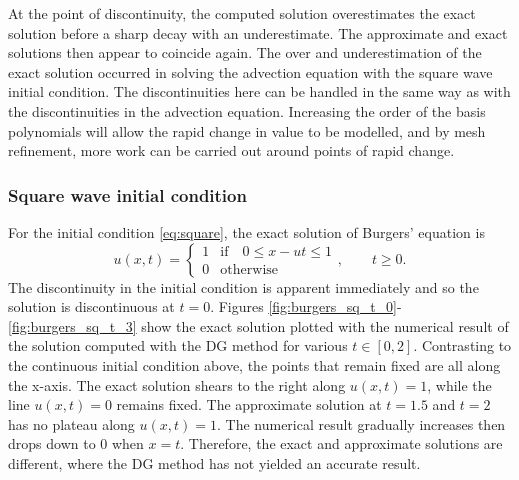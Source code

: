 At the point of discontinuity, the computed solution overestimates the exact solution before a sharp decay with an underestimate. The approximate and exact solutions then appear to coincide again.
The over and underestimation of the exact solution occurred in solving the advection equation with the square wave initial condition.
The discontinuities here can be handled in the same way as with the discontinuities in the advection equation.
Increasing the order of the basis polynomials will allow the rapid change in value to be modelled, and by mesh refinement, more work can be carried out around points of rapid change.

\iffalse
In order to deal with the discontinuity, some form of mesh refinement might be appropriate.
Specifically, increasing the number of points around the point of discontinuity may help to approximate the solution better there.
Additionally, increasing the order of the polynomial basis functions of the mesh could allow the discontinuity to be handled.
Choosing a quadratic or higher order basis, instead of the linear polynomials used for this implementation, would allow the polynomial to handle the sharp change in values around the discontinuity more easily. 
\fi

\subsubsection{Square wave initial condition}

For the initial condition \eqref{eq:square}, the exact solution of Burgers' equation is
\[
u(x,t) = \begin{cases}
		1 & \text{if}\quad 0 \leq x-ut \leq 1 \\
        0 & \text{otherwise}
	\end{cases}, \qquad t \geq 0.
\]
The discontinuity in the initial condition is apparent immediately and so the solution is discontinuous at $t=0$.
Figures \ref{fig:burgers_sq_t_0}-\ref{fig:burgers_sq_t_3} show the exact solution plotted with the numerical result of the solution computed with the DG method for various $t\in \left[0,2\right]$.
Contrasting to the continuous initial condition above, the points that remain fixed are all along the x-axis.
The exact solution shears to the right along $u(x,t)=1$, while the line $u(x,t)=0$ remains fixed.
The approximate solution at $t=1.5$ and $t=2$ has no plateau along $u(x,t)=1$.
The numerical result gradually increases then drops down to 0 when $x=t$.
Therefore, the exact and approximate solutions are different, where the DG method has not yielded an accurate result.

